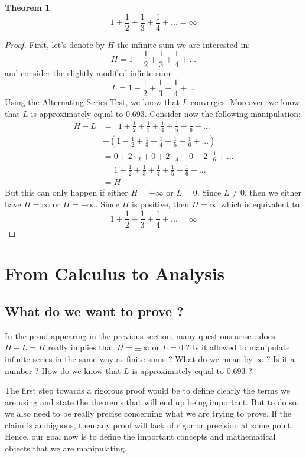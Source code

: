 \documentclass[12pt]{article}
\theoremstyle{definition}
\newtheorem*{theorem}{Theorem}
\begin{document}
\begin{theorem}
    $$ 1 + \frac{1}{2} + \frac{1}{3} + \frac{1}{4} + ... = \infty$$
\end{theorem}

\begin{proof}
    First, let's denote by $H$ the infinite sum we are interested in:
    $$H = 1 + \frac{1}{2} + \frac{1}{3} + \frac{1}{4} + ...$$
    and consider the slightly modified infinte sum
    $$L = 1 - \frac{1}{2} + \frac{1}{3} - \frac{1}{4} + ...$$
    Using the Alternating Series Test, we know that $L$ converges. Moreover, we know that $L$ is approximately equal to 0.693. Consider now the following manipulation:
    \begin{align*}
        H - L &= \ \; 1 + \frac{1}{2} + \frac{1}{3} + \frac{1}{4} + \frac{1}{5} + \frac{1}{6} + ... \\
        & - \left(1 - \frac{1}{2} + \frac{1}{3} - \frac{1}{4} + \frac{1}{5} - \frac{1}{6} + ...\right) \\
        &= 0 + 2\cdot \frac{1}{2} + 0 + 2\cdot \frac{1}{4} + 0 + 2\cdot \frac{1}{6} + ... \\
        &= 1 + \frac{1}{2} + \frac{1}{3} + \frac{1}{4} + \frac{1}{5} + \frac{1}{6} + ... \\
        &= H
    \end{align*}
    But this can only happen if either $H = \pm \infty$ or $L = 0$. Since $L \neq 0$, then we either have $H = \infty$ or $H = -\infty$. Since $H$ is positive, then $H = \infty$ which is equivalent to
    $$ 1 + \frac{1}{2} + \frac{1}{3} + \frac{1}{4} + ... = \infty$$
\end{proof}

\section{From Calculus to Analysis}

\subsection{What do we want to prove ?}

In the proof appearing in the previous section, many questions arise : does $H - L = H$ really implies that $H = \pm \infty$ or $L = 0$ ? Is it allowed to manipulate infinite series in the same way as finite sums ? What do we mean by $\infty$ ? Is it a number ? How do we know that $L$ is approximately equal to 0.693 ? 

The first step towards a rigorous proof would be to define clearly the terms we are using and state the theorems that will end up being important. But to do so, we also need to be really precise concerning what we are trying to prove. If the claim is ambiguous, then any proof will lack of rigor or precision at some point. Hence, our goal now is to define the important concepts and mathematical objects that we are manipulating.
\end{document}

